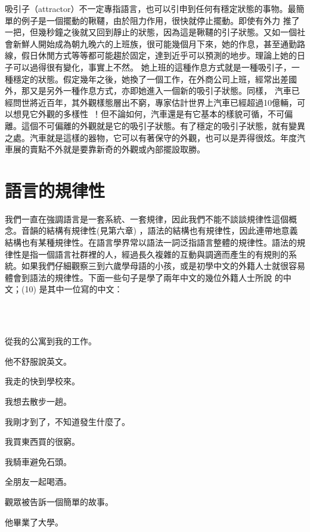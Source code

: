 吸引子（attractor）不一定專指語言，也可以引申到任何有穩定狀態的事物。最簡單的例子是一個擺動的鞦韆，由於阻力作用，很快就停止擺動。即使有外力 推了一把，但幾秒鐘之後就又回到靜止的狀態，因為這是鞦韆的引子狀態。又如一個社會新鮮人開始成為朝九晚六的上班族，很可能幾個月下來，她的作息，甚至通勤路線，假日休閒方式等等都可能趨於固定，達到近乎可以預測的地步。理論上她的日子可以過得很有變化，事實上不然。 她上班的這種作息方式就是一種吸引子，一種穩定的狀態。假定幾年之後，她換了一個工作，在外商公司上班，經常出差國外，那又是另外一種作息方式，亦即她進入一個新的吸引子狀態。同樣， 汽車已經問世將近百年，其外觀樣態層出不窮，專家估計世界上汽車已經超過10億輛，可以想見它外觀的多樣性~！但不論如何，汽車還是有它基本的樣貌可循，不可偏離。這個不可偏離的外觀就是它的吸引子狀態。有了穩定的吸引子狀態，就有變異之處。汽車就是這樣的器物，它可以有著保守的外觀，也可以是弄得很炫。年度汽車展的賣點不外就是要靠新奇的外觀或內部擺設取勝。   

\section{語言的規律性} 

我們一直在強調語言是一套系統、一套規律，因此我們不能不談談規律性這個概念。音韻的結構有規律性(見第六章) ，語法的結構也有規律性，因此連帶地意義結構也有某種規律性。在語言學界常以語法一詞泛指語言整體的規律性。語法的規律性是指一個語言社群裡的人，經過長久複雜的互動與調適而產生的有規則的系統。如果我們仔細觀察三到六歲學母語的小孩，或是初學中文的外籍人士就很容易體會到語法的規律性。下面一些句子是學了兩年中文的幾位外籍人士所說 的中文；(10) 是其中一位寫的中文： 

\ea%
\label{ex:key:9}
\gll\\
\\
\glt
\z

從我的公寓到我的工作。

他不舒服說英文。

我走的快到學校來。

我想去散步一趟。

我剛才到了，不知道發生什麼了。

我買東西買的很窮。

我騎車避免石頭。

全朋友一起喝酒。

觀眾被告訴一個簡單的故事。

他畢業了大學。

\ea%
\label{ex:key:10}
\gll\\
\\
\glt
\z

